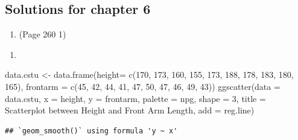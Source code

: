 \documentclass{article}
\newenvironment{Shaded}{\begin{snugshade}}{\end{snugshade}}
\newcommand{\AttributeTok}[1]{\textcolor[rgb]{0.77,0.63,0.00}{#1}}
\newcommand{\DecValTok}[1]{\textcolor[rgb]{0.00,0.00,0.81}{#1}}
\newcommand{\FunctionTok}[1]{\textcolor[rgb]{0.00,0.00,0.00}{#1}}
\newcommand{\NormalTok}[1]{#1}
\newcommand{\OtherTok}[1]{\textcolor[rgb]{0.56,0.35,0.01}{#1}}
\newcommand{\StringTok}[1]{\textcolor[rgb]{0.31,0.60,0.02}{#1}}
\begin{document}
\hypertarget{solutions-for-chapter-6}{%
\subsection{Solutions for chapter 6}\label{solutions-for-chapter-6}}

\begin{enumerate}
\def\labelenumi{\arabic{enumi}.}
\tightlist
\item
  (Page 260 1)
\end{enumerate}

\begin{enumerate}
\def\labelenumi{(\arabic{enumi})}
\tightlist
\item
\end{enumerate}

\begin{Shaded}
\begin{Highlighting}[]
\NormalTok{data.cstu }\OtherTok{\textless{}{-}} \FunctionTok{data.frame}\NormalTok{(}\AttributeTok{height=} \FunctionTok{c}\NormalTok{(}\DecValTok{170}\NormalTok{, }\DecValTok{173}\NormalTok{, }\DecValTok{160}\NormalTok{, }\DecValTok{155}\NormalTok{, }\DecValTok{173}\NormalTok{, }\DecValTok{188}\NormalTok{, }\DecValTok{178}\NormalTok{, }\DecValTok{183}\NormalTok{, }\DecValTok{180}\NormalTok{, }\DecValTok{165}\NormalTok{), }
                        \AttributeTok{frontarm =} \FunctionTok{c}\NormalTok{(}\DecValTok{45}\NormalTok{, }\DecValTok{42}\NormalTok{, }\DecValTok{44}\NormalTok{, }\DecValTok{41}\NormalTok{, }\DecValTok{47}\NormalTok{, }\DecValTok{50}\NormalTok{, }\DecValTok{47}\NormalTok{, }\DecValTok{46}\NormalTok{, }\DecValTok{49}\NormalTok{, }\DecValTok{43}\NormalTok{))}
\FunctionTok{ggscatter}\NormalTok{(}\AttributeTok{data =}\NormalTok{ data.cstu, }\AttributeTok{x =} \StringTok{\textquotesingle{}height\textquotesingle{}}\NormalTok{, }\AttributeTok{y =} \StringTok{\textquotesingle{}frontarm\textquotesingle{}}\NormalTok{, }\AttributeTok{palette =} \StringTok{\textquotesingle{}npg\textquotesingle{}}\NormalTok{, }
          \AttributeTok{shape =} \DecValTok{3}\NormalTok{, }\AttributeTok{title =} \StringTok{\textquotesingle{}Scatterplot between Height and Front Arm Length\textquotesingle{}}\NormalTok{, }
          \AttributeTok{add =} \StringTok{\textquotesingle{}reg.line\textquotesingle{}}\NormalTok{)}
\end{Highlighting}
\end{Shaded}

\begin{verbatim}
## `geom_smooth()` using formula 'y ~ x'
\end{verbatim}
\end{document}
